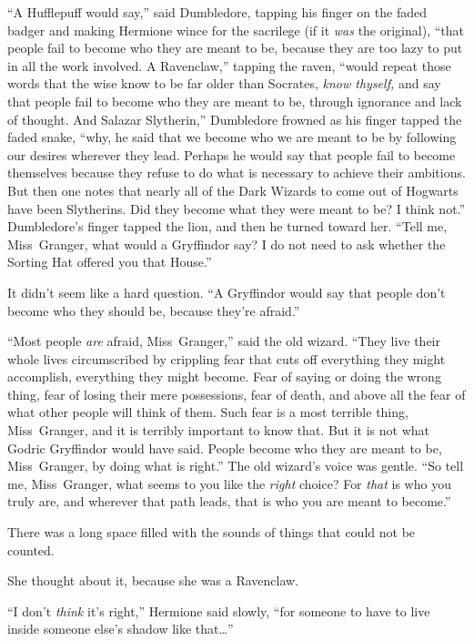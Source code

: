 “A Hufflepuff would say,” said Dumbledore, tapping his finger on the faded badger and making Hermione wince for the sacrilege (if it \emph{was} the original), “that people fail to become who they are meant to be, because they are too lazy to put in all the work involved. A Ravenclaw,” tapping the raven, “would repeat those words that the wise know to be far older than Socrates, \emph{know thyself,} and say that people fail to become who they are meant to be, through ignorance and lack of thought. And Salazar Slytherin,” Dumbledore frowned as his finger tapped the faded snake, “why, he said that we become who we are meant to be by following our desires wherever they lead. Perhaps he would say that people fail to become themselves because they refuse to do what is necessary to achieve their ambitions. But then one notes that nearly all of the Dark Wizards to come out of Hogwarts have been Slytherins. Did they become what they were meant to be? I think not.” Dumbledore’s finger tapped the lion, and then he turned toward her. “Tell me, Miss~Granger, what would a Gryffindor say? I do not need to ask whether the Sorting Hat offered you that House.”

It didn’t seem like a hard question. “A Gryffindor would say that people don’t become who they should be, because they’re afraid.”

“Most people \emph{are} afraid, Miss~Granger,” said the old wizard. “They live their whole lives circumscribed by crippling fear that cuts off everything they might accomplish, everything they might become. Fear of saying or doing the wrong thing, fear of losing their mere possessions, fear of death, and above all the fear of what other people will think of them. Such fear is a most terrible thing, Miss~Granger, and it is terribly important to know that. But it is not what Godric Gryffindor would have said. People become who they are meant to be, Miss~Granger, by doing what is right.” The old wizard’s voice was gentle. “So tell me, Miss~Granger, what seems to you like the \emph{right} choice? For \emph{that} is who you truly are, and wherever that path leads, that is who you are meant to become.”

There was a long space filled with the sounds of things that could not be counted.

She thought about it, because she was a Ravenclaw.

“I don’t \emph{think} it’s right,” Hermione said slowly, “for someone to have to live inside someone else’s shadow like that…”

